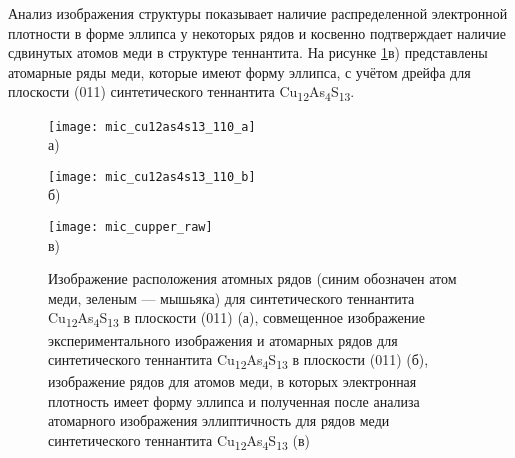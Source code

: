 Анализ изображения структуры показывает наличие распределенной электронной плотности в форме эллипса у некоторых рядов и косвенно подтверждает наличие сдвинутых атомов меди в структуре теннантита. На рисунке \ref{img:figure5}в) представлены атомарные ряды меди, которые имеют форму эллипса, с учётом дрейфа для плоскости (011) синтетического теннантита Cu\textsubscript{12}As\textsubscript{4}S\textsubscript{13}.


\begin{figure}[ht]
  \begin{minipage}[ht]{0.3\linewidth}\centering
    \texttt{[image: mic\_cu12as4s13\_110\_a]} \\ а)
  \end{minipage}
  \hfill
  \begin{minipage}[ht]{0.3\linewidth}\centering
    \texttt{[image: mic\_cu12as4s13\_110\_b]} \\ б)
  \end{minipage}
  \hfill
  \begin{minipage}[ht]{0.3\linewidth}\centering
    \texttt{[image: mic\_cupper\_raw]} \\ в)
  \end{minipage}
      \caption[Изображение расположения атомных рядов (синим обозначен атом меди, зеленым --- мышьяка) для синтетического теннантита Cu\textsubscript{12}As\textsubscript{4}S\textsubscript{13} в плоскости (011) (а), совмещенное изображение экспериментального изображения и атомарных рядов для синтетического теннантита Cu\textsubscript{12}As\textsubscript{4}S\textsubscript{13} в плоскости (011) (б),  изображение  рядов для атомов меди, в которых электронная плотность имеет форму эллипса и полученная после анализа атомарного изображения эллиптичность для рядов меди синтетического теннантита Cu\textsubscript{12}As\textsubscript{4}S\textsubscript{13} (в)]{Изображение расположения атомных рядов (синим обозначен атом меди, зеленым --- мышьяка) для синтетического теннантита Cu\textsubscript{12}As\textsubscript{4}S\textsubscript{13} в плоскости (011) (а), совмещенное изображение экспериментального изображения и атомарных рядов для синтетического теннантита Cu\textsubscript{12}As\textsubscript{4}S\textsubscript{13} в плоскости (011) (б),  изображение  рядов для атомов меди, в которых электронная плотность имеет форму эллипса и полученная после анализа атомарного изображения эллиптичность для рядов меди синтетического теннантита Cu\textsubscript{12}As\textsubscript{4}S\textsubscript{13} (в)}
    \label{img:figure5}
\end{figure}



